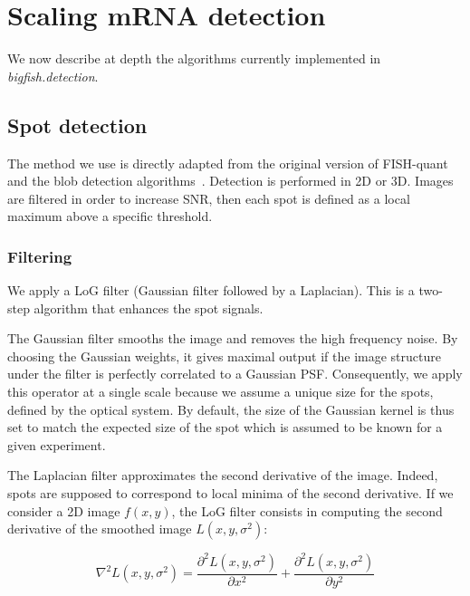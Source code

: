 \section{Scaling \ac{mRNA} detection}
\label{sec:method}

We now describe at depth the algorithms currently implemented in \emph{bigfish.detection}.

\subsection{Spot detection}
\label{subsec:spot_detection}

The method we use is directly adapted from the original version of FISH-quant~\cite{mueller_fish-quant_2013} and the blob detection algorithms~\cite{walt_scikit-image_2014}.
Detection is performed in 2D or 3D. Images are filtered in order to increase \ac{SNR}, then each spot is defined as a local maximum above a specific threshold.

\subsubsection{Filtering}

We apply a \ac{LoG} filter (Gaussian filter followed by a Laplacian).
This is a two-step algorithm that enhances the spot signals. 

The Gaussian filter smooths the image and removes the high frequency noise. By choosing the Gaussian weights, it gives maximal output if the image structure under the filter is perfectly correlated to a Gaussian \ac{PSF}. 
Consequently, we apply this operator at a single scale because we assume a unique size for the spots, defined by the optical system. 
By default, the size of the Gaussian kernel is thus set to match the expected size of the spot which is assumed to be known for a given experiment. %

The Laplacian filter approximates the second derivative of the image. Indeed, spots are supposed to correspond to local minima of the second derivative. 
If we consider a 2D image $f(x,y)$, the \ac{LoG} filter consists in computing the second derivative of the smoothed image $L(x, y, \sigma^2)$:

\begin{equation}
	{\displaystyle \nabla^{2}L(x, y, \sigma^2) = \frac{\partial^{2}L(x, y, \sigma^2)}{\partial x^2} + \frac{\partial^{2}L(x, y, \sigma^2)}{\partial y^2}}
\end{equation}

